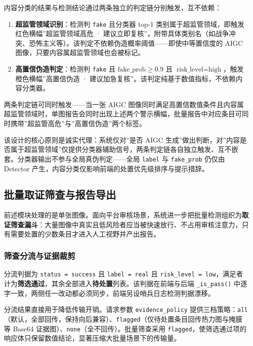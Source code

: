 \documentclass[UTF8, a4paper, 12pt]{ctexart}
\begin{document}
内容分类的结果与检测结论通过两条独立的判定链分别触发，互不依赖：

\begin{enumerate}
 \item \textbf{超监管领域识别}：检测判 \texttt{fake} 且分类器 top-1 类别属于超监管领域，即触发红色横幅”超监管领域高危 · 建议立即复核”，附带具体类别名（如战争冲突、恐怖主义等）。该判定不依赖伪造概率阈值——即使中等置信度的 AIGC 图像，只要内容属超监管领域也会被标记。
 \item \textbf{高置信伪造判定}：检测判 \texttt{fake} 且 $\text{fake\_prob} \ge 0.9$ 且 $\text{risk\_level} = \text{high}$，触发橙色横幅”高置信伪造 · 建议加急复核”。该判定纯基于数值指标，不依赖内容分类器。
\end{enumerate}

两条判定链可同时触发——当一张 AIGC 图像同时满足高置信数值条件且内容属超监管领域时，单图报告会同时出现上述两个警示横幅，批量报告中对应条目可同时携带”超监管高危”与”高置信伪造”两个标签。

该设计的核心原则是诚实代理：系统仅对”是否 AIGC 生成”做出判断，对”内容是否属于超监管领域”仅提供分类器辅助信号，两条判定链各自独立触发、互不嵌套。分类器输出不参与全局真伪判定——全局 \texttt{label} 与 \texttt{fake\_prob} 仍仅由 Detector 产生，内容分类仅影响前端的处置优先级排序与提示措辞。

\subsection{批量取证筛查与报告导出}
\label{sec:screening-and-report}

前述模块处理的是单张图像。面向平台审核场景，系统进一步把批量检测组织为\textbf{取证筛查漏斗}：大量图像中真实且低风险者应当被快速放行、不占用审核注意力，只有需要处置的少数条目才进入人工视野并产出报告。

\subsubsection{筛查分流与证据裁剪}

分流判据为 \texttt{status = success} 且 \texttt{label = real} 且 \texttt{risk\_level = low}，满足者计为\textbf{筛选通过}，其余全部进入\textbf{待处置}列表。该判据在前端与后端 \texttt{\_is\_pass()} 中逐字一致，两侧任一改动都必须同步，前端另设哨兵日志检测判据漂移。

分流结果直接用于降低传输开销。请求参数 \texttt{evidence\_policy} 提供三档策略：\texttt{all}（默认，全部回传，保持向后兼容）、\texttt{flagged}（仅待处置条目回传热力图与掩膜等 Base64 证据图）、\texttt{none}（全不回传）。批量筛查采用 \texttt{flagged}，使筛选通过项的响应体只保留数值结论，显著压缩大批量场景下的传输量。
\end{document}
